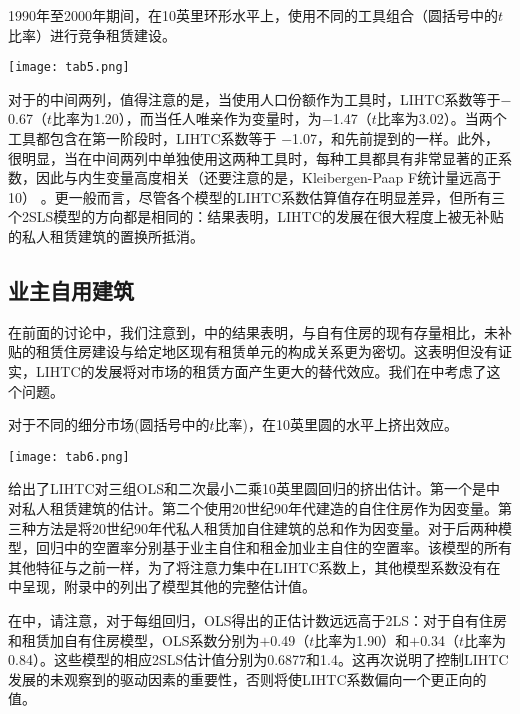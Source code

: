 \documentclass[lang=cn,11pt,a4paper]{paper}
\begin{document}
\begin{table}[h]
  \caption{1990年至2000年期间，在10英里环形水平上，使用不同的工具组合（圆括号中的$t$比率）进行竞争租赁建设。}\label{tab5}
  \texttt{[image: tab5.png]}
\noindent{}
\end{table}

对于的中间两列，值得注意的是，当使用人口份额作为工具时，LIHTC系数等于$−$0.67（$t$比率为1.20），而当任人唯亲作为变量时，为$−$1.47（$t$比率为3.02）。当两个工具都包含在第一阶段时，LIHTC系数等于 $-$1.07，和先前提到的一样。此外，很明显，当在中间两列中单独使用这两种工具时，每种工具都具有非常显著的正系数，因此与内生变量高度相关（还要注意的是，Kleibergen-Paap F统计量远高于10） 。更一般而言，尽管各个模型的LIHTC系数估算值存在明显差异，但所有三个2SLS模型的方向都是相同的：结果表明，LIHTC的发展在很大程度上被无补贴的私人租赁建筑的置换所抵消。

\subsection{业主自用建筑}

在前面的讨论中，我们注意到，中的结果表明，与自有住房的现有存量相比，未补贴的租赁住房建设与给定地区现有租赁单元的构成关系更为密切。这表明但没有证实，LIHTC的发展将对市场的租赁方面产生更大的替代效应。我们在中考虑了这个问题。

\begin{table}[h]
  \caption{对于不同的细分市场(圆括号中的$t$比率)，在10英里圆的水平上挤出效应。}\label{tab6}
  \texttt{[image: tab6.png]}
\noindent{}
\end{table}

给出了LIHTC对三组OLS和二次最小二乘10英里圆回归的挤出估计。第一个是中对私人租赁建筑的估计。第二个使用20世纪90年代建造的自住住房作为因变量。第三种方法是将20世纪90年代私人租赁加自住建筑的总和作为因变量。对于后两种模型，回归中的空置率分别基于业主自住和租金加业主自住的空置率。该模型的所有其他特征与之前一样，为了将注意力集中在LIHTC系数上，其他模型系数没有在中呈现，附录中的列出了模型其他的完整估计值。

在中，请注意，对于每组回归，OLS得出的正估计数远远高于2LS：对于自有住房和租赁加自有住房模型，OLS系数分别为$+$0.49（$t$比率为1.90）和$+$0.34（$t$比率为0.84）。这些模型的相应2SLS估计值分别为0.6877和1.4。这再次说明了控制LIHTC发展的未观察到的驱动因素的重要性，否则将使LIHTC系数偏向一个更正向的值。
\end{document}
